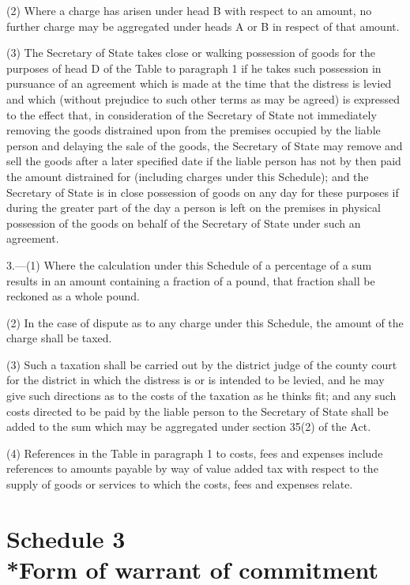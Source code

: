 \documentclass[12pt,a4paper]{article}
\begin{document}
(2) Where a charge has arisen under head B with respect to an amount, no further charge may be aggregated under heads A or B in respect of that amount.

(3) The Secretary of State takes close or walking possession of goods for the purposes of head D of the Table to paragraph 1 if he takes such possession in pursuance of an agreement which is made at the time that the distress is levied and which (without prejudice to such other terms as may be agreed) is expressed to the effect that, in consideration of the Secretary of State not immediately removing the goods distrained upon from the premises occupied by the liable person and delaying the sale of the goods, the Secretary of State may remove and sell the goods after a later specified date if the liable person has not by then paid the amount distrained for (including charges under this Schedule); and the Secretary of State is in close possession of goods on any day for these purposes if during the greater part of the day a person is left on the premises in physical possession of the goods on behalf of the Secretary of State under such an agreement.

\medskip

3.—(1) Where the calculation under this Schedule of a percentage of a sum results in an amount containing a fraction of a pound, that fraction shall be reckoned as a whole pound.

(2) In the case of dispute as to any charge under this Schedule, the amount of the charge shall be taxed.

(3) Such a taxation shall be carried out by the district judge of the county court for the district in which the distress is or is intended to be levied, and he may give such directions as to the costs of the taxation as he thinks fit; and any such costs directed to be paid by the liable person to the Secretary of State shall be added to the sum which may be aggregated under section 35(2) of the Act.

(4) References in the Table in paragraph 1 to costs, fees and expenses include references to amounts payable by way of value added tax with respect to the supply of goods or services to which the costs, fees and expenses relate.

\part[Schedule 3 --- Form of warrant of commitment]{Schedule 3\\*Form of warrant of commitment}
\end{document}
